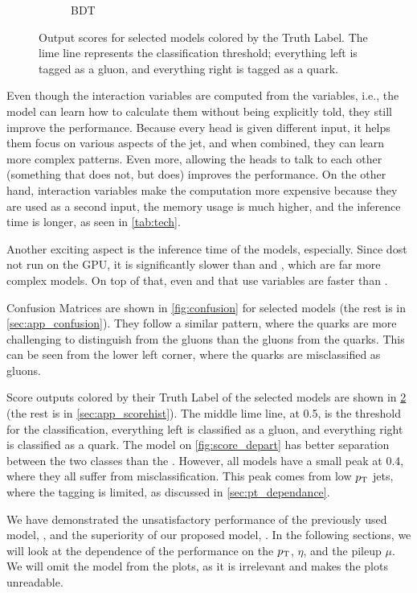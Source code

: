 \begin{figure}[ht]
\begin{subfigure}[b]{0.49\textwidth}
        \caption{BDT}
        \label{fig:score_bdt}
    \end{subfigure}
    \caption{Output scores for selected models colored by the Truth Label. The lime line represents the classification threshold; everything left is tagged as a gluon, and everything right is tagged as a quark.}
    \label{fig:score}
\end{figure}

Even though the interaction variables are computed from the \PFO variables, i.e., the model can learn how to calculate them without being explicitly told, they still improve the performance.
Because every head is given different input, it helps them focus on various aspects of the jet, and when combined, they can learn more complex patterns.
Even more, allowing the heads to talk to each other (something that \ParT does not, but \depart does) improves the performance.
On the other hand, interaction variables make the computation more expensive because they are used as a second input, the memory usage is much higher, and the inference time is longer, as seen in \cref{tab:tech}.


Another exciting aspect is the inference time of the models, \bdt especially. 
Since \bdt dost not run on the GPU, it is significantly slower than \highway and \fc, which are far more complex models.
On top of that, even \EFN and \PFN that use \PFO variables are faster than \bdt.

Confusion Matrices are shown in \cref{fig:confusion} for selected models (the rest is in \cref{sec:app_confusion}).
They follow a similar pattern, where the quarks are more challenging to distinguish from the gluons than the gluons from the quarks.
This can be seen from the lower left corner, where the quarks are misclassified as gluons.

Score outputs colored by their Truth Label of the selected models are shown in \cref{fig:score} (the rest is in \cref{sec:app_scorehist}).
The middle lime line, at 0.5, is the threshold for the classification, everything left is classified as a gluon, and everything right is classified as a quark.
The \depart model on \cref{fig:score_depart} has better separation between the two classes than the \bdt.
However, all models have a small peak at 0.4, where they all suffer from misclassification.
This peak comes from low $p_\text{T}$ jets, where the tagging is limited, as discussed in \cref{sec:pt_dependance}.

We have demonstrated the unsatisfactory performance of the previously used model, \bdt, and the superiority of our proposed model, \depart.
In the following sections, we will look at the dependence of the performance on the $p_\text{T}$, $\eta$, and the pileup $\mu$.
We will omit the \bdt model from the plots, as it is irrelevant and makes the plots unreadable.

